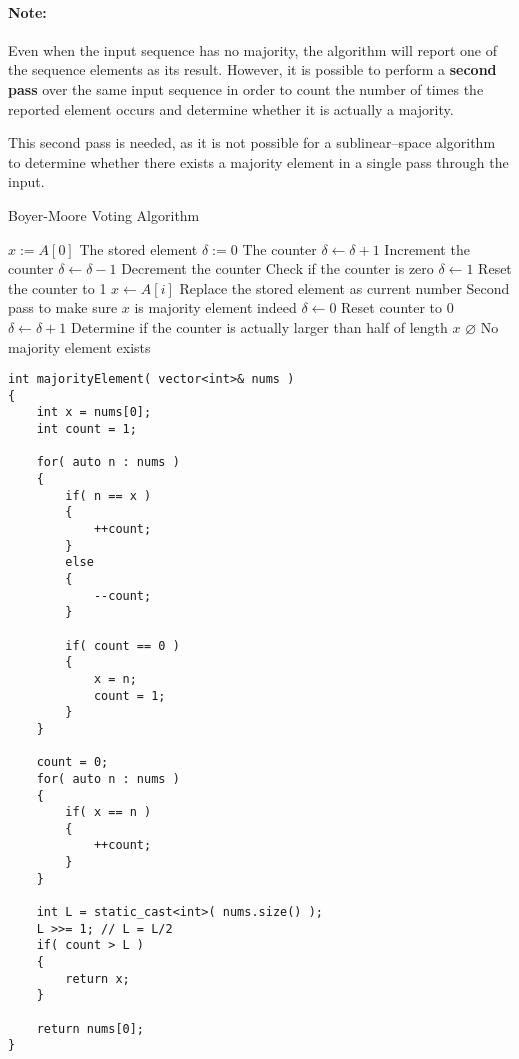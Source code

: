 \paragraph{Note:}
Even when the input sequence has no majority, the algorithm will report one of the sequence elements as its result. However, it is possible to perform a \textbf{second pass} over the same input sequence in order to count the number of times the reported element occurs and determine whether it is actually a majority.
\par
This second pass is needed, as it is not possible for a sublinear--space algorithm to determine whether there exists a majority element in a single pass through the input.
\setcounter{algorithm}{0}
\begin{algorithm}[H]
\caption{Boyer-Moore Voting Algorithm}
\begin{algorithmic}[1]
\State $x:=A[0]$ \Comment The stored element
\State $\delta:=0$ \Comment The counter
\State $\delta\gets\delta+1$ \Comment Increment the counter
\Else
\State $\delta\gets\delta-1$ \Comment Decrement the counter
\EndIf
\State Check if the counter is zero
\State $\delta\gets 1$ \Comment Reset the counter to 1
\State $x\gets A[i]$ \Comment Replace the stored element as current number
\EndIf
\EndFor
\State Second pass to make sure $x$ is majority element indeed
\State $\delta\gets 0$ \Comment Reset counter to 0
\State $\delta\gets \delta +1$
\EndIf
\EndFor
\State Determine if the counter is actually larger than half of length
\State \Return $x$
\Else
\State \Return $\varnothing$ \Comment No majority element exists
\EndIf
\EndProcedure
\end{algorithmic}
\end{algorithm}
\setcounter{lstlisting}{0}
\begin{lstlisting}[style=customc]
int majorityElement( vector<int>& nums )
{
    int x = nums[0];
    int count = 1;

    for( auto n : nums )
    {
        if( n == x )
        {
            ++count;
        }
        else
        {
            --count;
        }

        if( count == 0 )
        {
            x = n;
            count = 1;
        }
    }

    count = 0;
    for( auto n : nums )
    {
        if( x == n )
        {
            ++count;
        }
    }

    int L = static_cast<int>( nums.size() );
    L >>= 1; // L = L/2
    if( count > L )
    {
        return x;
    }

    return nums[0];
}
\end{lstlisting}
